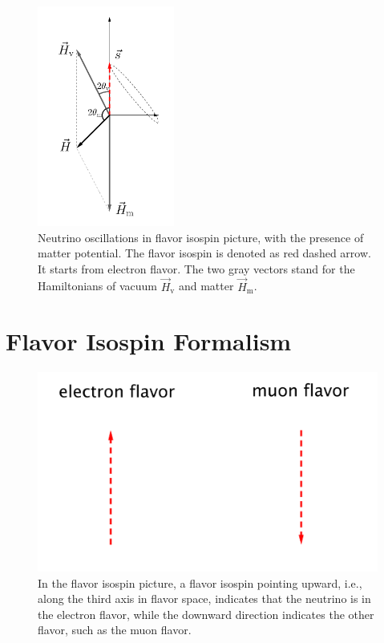 \begin{figure}[htbp]
    \centering
    \includegraphics[width=0.4\textwidth]{chapters/assets/matter/matter-effect-notsolarge-density}
    \caption{Neutrino oscillations in flavor isospin picture, with the presence of matter potential. The flavor isospin is denoted as red dashed arrow. It starts from electron flavor. The two gray vectors stand for the Hamiltonians of vacuum $\vec H_{\mathrm v}$ and matter $\vec H_{\mathrm m}$.}
    \label{chap:basics-sec:flavor-isospin-pic-fig:matter-effect-notsolarge-density}
\end{figure}










\section{\label{chap:basics-sec:flavor-isospin-pic}Flavor Isospin Formalism}


\begin{figure}
    \centering
    \vspace*{-10pt}
    \includegraphics[width=\textwidth]{chapters/assets/basics/flavor-isospin-illus}
    \caption{In the flavor isospin picture, a flavor isospin pointing upward, i.e., along the third axis in flavor space, indicates that the neutrino is in the electron flavor, while the downward direction indicates the other flavor, such as the muon flavor.}
    \label{chap:basics-sec:flavor-isospin-pic-fig:flavor-isospin-illus}
\end{figure}

